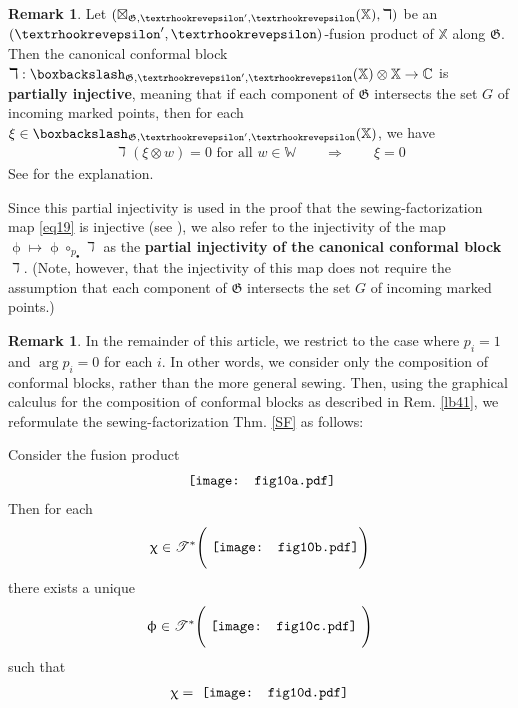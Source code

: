 \documentclass[11pt,b5paper,notitlepage]{article}
\theoremstyle{definition}
\newtheorem{rem}[df]{Remark}
\theoremstyle{plain}
\newcommand{\blt}{\bullet}
\newcommand{\Xbb}{\mathbb X}
\newcommand{\Wbb}{\mathbb W}
\newcommand{\Cbb}{\mathbb C}
\newcommand{\<}{\left\langle}
\renewcommand{\>}{\right\rangle}
\newcommand{\ST}{\mathscr{T}}
\newcommand{\bbs}{\boxbackslash}
\newcommand{\fg}{\mathfrak{G}}
\newcommand{\hqed}{\hfill\qedsymbol}
\newcommand{\tipae}{\text{\textrhookrevepsilon}}
\numberwithin{equation}{section}
\begin{document}
\begin{rem}\label{SF2}
Let $(\boxtimes_{\fg,\tipae',\tipae}(\Xbb),\daleth)$ be an $(\tipae',\tipae)$-fusion product of $\Xbb$ along $\fg$. Then the canonical conformal block $\daleth:\bbs_{\fg,\tipae',\tipae}(\Xbb)\otimes\Xbb\rightarrow\Cbb$ is \textbf{partially injective}, meaning that if each component of $\fg$ intersects the set $G$ of incoming marked points, then for each $\xi\in\bbs_{\fg,\tipae',\tipae}(\Xbb)$, we have
\begin{align}
\daleth(\xi\otimes w)=0\text{ for all $w\in\Wbb$}\qquad\Longrightarrow\qquad \xi=0
\end{align}
See \cite[Rem. 3.17]{GZ2} for the explanation. 

Since this partial injectivity is used in the proof that the sewing-factorization map \eqref{eq19} is injective (see \cite[Subsec. 2.5.2]{GZ3}), we also refer to the injectivity of the map $\upphi\mapsto\upphi\circ_{p_\blt}\daleth$ as the \textbf{partial injectivity of the canonical conformal block $\daleth$}. (Note, however, that the injectivity of this map does not require the assumption that each component of $\fg$ intersects the set $G$ of incoming marked points.)  \hqed
\end{rem}



 \begin{rem}\label{lb42}
In the remainder of this article, we restrict to the case where $p_i=1$ and $\arg p_i=0$ for each $i$. In other words, we consider only the composition of conformal blocks, rather than the more general sewing.
Then, using the graphical calculus for the composition of conformal blocks as described in Rem. \ref{lb41}, we reformulate the sewing-factorization Thm. \ref{SF} as follows: 

Consider the fusion product
  \begin{align}\label{eq26}
	\vcenter{\hbox{{
			\texttt{[image: fig10a.pdf]}}}}
  \end{align}
Then for each
\begin{align*}
\upchi\in \ST^*\Bigg(\vcenter{\hbox{{
\texttt{[image: fig10b.pdf]}}}}\Bigg)
	\end{align*}
	there exists a unique 
	\begin{align*}
		\upphi\in \ST^*\Bigg(\vcenter{\hbox{{
		 \texttt{[image: fig10c.pdf]}}}}~\Bigg)
	\end{align*}
such that 
\begin{align*}
\upchi=\vcenter{\hbox{{
\texttt{[image: fig10d.pdf]}}}}
	\end{align*}
\hqed
 \end{rem}
\end{document}

